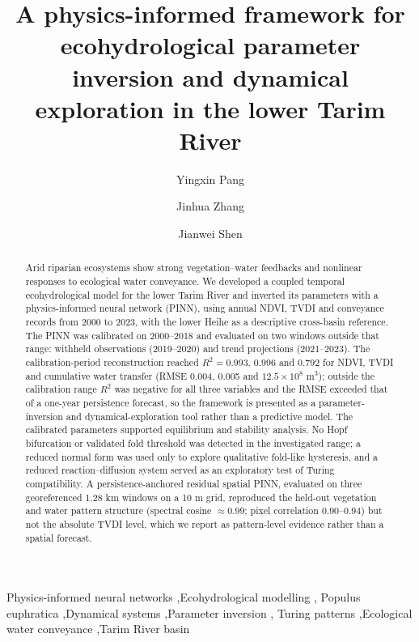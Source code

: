 \documentclass[preprint,review,12pt,3p]{elsarticle}
\begin{document}
	
	\begin{frontmatter}
		
		\title{A physics-informed framework for ecohydrological parameter inversion and dynamical exploration in the lower Tarim River}
		
		\author{Yingxin Pang}
		\address{School of Mathematics and Statistics, North China University of Water Resources and Electric Power, Zhengzhou, 450046, China}
		
		\author{Jinhua Zhang}
		\address{School of Electrical Engineering, North China University of Water Resources and Electric Power, Zhengzhou, 450046, China}
		
		\author{Jianwei Shen}
		\address{School of Mathematics and Statistics, North China University of Water Resources and Electric Power, Zhengzhou, 450046, China}
		
		
		\begin{abstract}
		Arid riparian ecosystems show strong vegetation--water feedbacks and nonlinear responses to ecological water conveyance. We developed a coupled temporal ecohydrological model for the lower Tarim River and inverted its parameters with a physics-informed neural network (PINN), using annual NDVI, TVDI and conveyance records from 2000 to 2023, with the lower Heihe as a descriptive cross-basin reference. The PINN was calibrated on 2000--2018 and evaluated on two windows outside that range: withheld observations (2019--2020) and trend projections (2021--2023). The calibration-period reconstruction reached $R^2=0.993$, $0.996$ and $0.792$ for NDVI, TVDI and cumulative water transfer (RMSE 0.004, 0.005 and $12.5\times10^{8}$ m$^{3}$); outside the calibration range $R^2$ was negative for all three variables and the RMSE exceeded that of a one-year persistence forecast, so the framework is presented as a parameter-inversion and dynamical-exploration tool rather than a predictive model. The calibrated parameters supported equilibrium and stability analysis. No Hopf bifurcation or validated fold threshold was detected in the investigated range; a reduced normal form was used only to explore qualitative fold-like hysteresis, and a reduced reaction--diffusion system served as an exploratory test of Turing compatibility. A persistence-anchored residual spatial PINN, evaluated on three georeferenced 1.28 km windows on a 10 m grid, reproduced the held-out vegetation and water pattern structure (spectral cosine $\approx0.99$; pixel correlation $0.90$--$0.94$) but not the absolute TVDI level, which we report as pattern-level evidence rather than a spatial forecast.
		\end{abstract}
		
		\begin{keyword}
			Physics-informed neural networks \sep Ecohydrological modelling \sep 
			Populus euphratica \sep Dynamical systems \sep Parameter inversion \sep 
			Turing patterns \sep Ecological water conveyance \sep Tarim River basin
		\end{keyword}
		
	\end{frontmatter}
	
\end{document}
